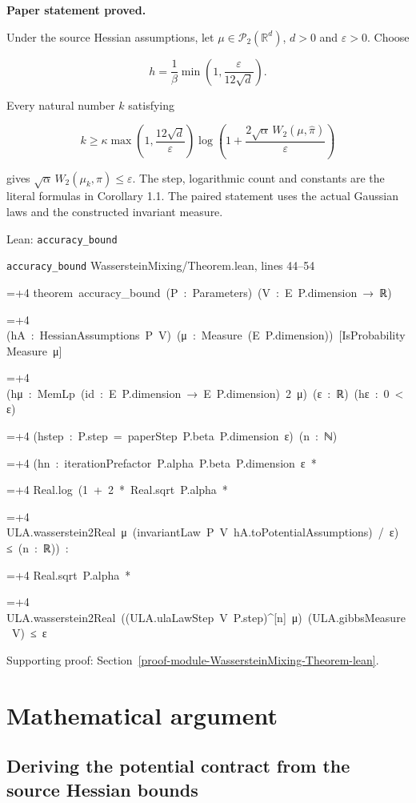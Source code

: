 \documentclass[11pt,a4paper]{report}
\newlength{\leancharwidth}
\newenvironment{leancode}{\par\smallskip\begingroup\ttfamily\footnotesize\raggedright
  \settowidth{\leancharwidth}{M}\setlength{\parskip}{0pt}\setlength{\parindent}{0pt}
  \frenchspacing}{\par\endgroup\smallskip}
\newcommand{\leanline}[2]{\hangindent=\dimexpr#1\leancharwidth+4\leancharwidth\relax
  \hangafter=1\noindent\hspace*{#1\leancharwidth}#2\par}
\newcommand{\leansource}[1]{\par{\footnotesize\color{leanmuted}#1}\par}
\begin{document}
\textbf{Paper statement proved.}



Under the source Hessian assumptions, let
\(\mu\in\mathcal P_2(\mathbb R^d)\), \(d>0\) and \(\varepsilon>0\).
Choose


\[h=\frac1\beta\min\!\left(1,\frac{\varepsilon}{12\sqrt d}\right).\]


Every natural number \(k\) satisfying


\[k\ge\kappa\max\!\left(1,\frac{12\sqrt d}{\varepsilon}\right)
\log\!\left(1+\frac{2\sqrt\alpha\,W_2(\mu,\widehat\pi)}{\varepsilon}\right)\]


gives \(\sqrt\alpha\,W_2(\mu_k,\pi)\le\varepsilon\).
The step, logarithmic count and constants are the literal formulas in
Corollary 1.1. The paired statement uses the actual Gaussian laws and the
constructed invariant measure.

\begin{leanbox}{Lean: \texttt{accuracy\_\allowbreak{}bound}}
\leansource{\texttt{accuracy\_\allowbreak{}bound} \quad WassersteinMixing/\allowbreak{}Theorem.lean, lines 44–54}
\begin{leancode}
\leanline{0}{theorem\ accuracy\_bound\ (P\ :\ Parameters)\ (V\ :\ E\ P.dimension\ →\ ℝ)}
\leanline{4}{(hA\ :\ HessianAssumptions\ P\ V)\ (μ\ :\ Measure\ (E\ P.dimension))\ [IsProbabilityMeasure\ μ]}
\leanline{4}{(hμ\ :\ MemLp\ (id\ :\ E\ P.dimension\ →\ E\ P.dimension)\ 2\ μ)\ (ε\ :\ ℝ)\ (hε\ :\ 0\ <\ ε)}
\leanline{4}{(hstep\ :\ P.step\ =\ paperStep\ P.beta\ P.dimension\ ε)\ (n\ :\ ℕ)}
\leanline{4}{(hn\ :\ iterationPrefactor\ P.alpha\ P.beta\ P.dimension\ ε\ *}
\leanline{6}{Real.log\ (1\ +\ 2\ *\ Real.sqrt\ P.alpha\ *}
\leanline{8}{ULA.wasserstein2Real\ μ\ (invariantLaw\ P\ V\ hA.toPotentialAssumptions)\ /\ ε)\ ≤\ (n\ :\ ℝ))\ :}
\leanline{4}{Real.sqrt\ P.alpha\ *}
\leanline{6}{ULA.wasserstein2Real\ ((ULA.ulaLawStep\ V\ P.step)\textasciicircum{}[n]\ μ)\ (ULA.gibbsMeasure\ V)\ ≤\ ε}
\end{leancode}
\end{leanbox}

{\small\color{gray}Supporting proof: Section~\ref{proof-module-WassersteinMixing-Theorem-lean}.\par}
\chapter{Mathematical argument}
\section{\texorpdfstring{Deriving the potential contract from the source Hessian bounds}{Deriving the potential contract from the source Hessian bounds}}
\end{document}
